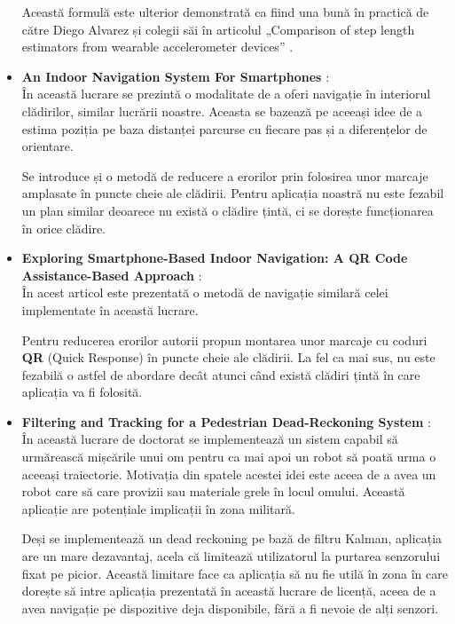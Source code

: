 \documentclass[12pt, a4paper, oneside]{article}
\begin{document}
\begin{itemize}
Această formulă este ulterior demonstrată ca fiind una bună în practică de către Diego Alvarez și colegii săi în articolul „Comparison of step length estimators from wearable accelerometer devices” \cite{StepLengthEstimatorsComparaison}.

\item \textbf{An Indoor Navigation System For Smartphones} \cite{AbhijitChandgadkar}:\\
În această lucrare se prezintă o modalitate de a oferi navigație în interiorul clădirilor, similar lucrării noastre. Aceasta se bazează pe aceeași idee de a estima poziția pe baza distanței parcurse cu fiecare pas și a diferențelor de orientare. 

Se introduce și o metodă de reducere a erorilor prin folosirea unor marcaje amplasate în puncte cheie ale clădirii. Pentru aplicația noastră nu este fezabil un plan similar deoarece nu există o clădire țintă, ci se dorește funcționarea în orice clădire.

\item \textbf{Exploring Smartphone-Based Indoor Navigation: A QR Code Assistance-Based Approach} \cite{QRNavigation}:\\
În acest articol este prezentată o metodă de navigație similară celei implementate în această lucrare. 

Pentru reducerea erorilor autorii propun montarea unor marcaje cu coduri \textbf{QR} (Quick Response) în puncte cheie ale clădirii. La fel ca mai sus, nu este fezabilă o astfel de abordare decât atunci când există clădiri țintă în care aplicația va fi folosită.

\item \textbf{Filtering and Tracking for a Pedestrian Dead-Reckoning System} \cite{SuratKwanmuang}:\\
În această lucrare de doctorat se implementează un sistem capabil să urmărească mișcările unui om pentru ca mai apoi un robot să poată urma o aceeași traiectorie. Motivația din spatele acestei idei este aceea de a avea un robot care să care provizii sau materiale grele în locul omului. Această aplicație are potențiale implicații în zona militară.

Deși se implementează un dead reckoning pe bază de filtru Kalman, aplicația are un mare dezavantaj, acela că limitează utilizatorul la purtarea senzorului fixat pe picior. Această limitare face ca aplicația să nu fie utilă în zona în care dorește să intre aplicația prezentată în această lucrare de licență, aceea de a avea navigație pe dispozitive deja disponibile, fără a fi nevoie de alți senzori.


\end{itemize}
\end{document}
